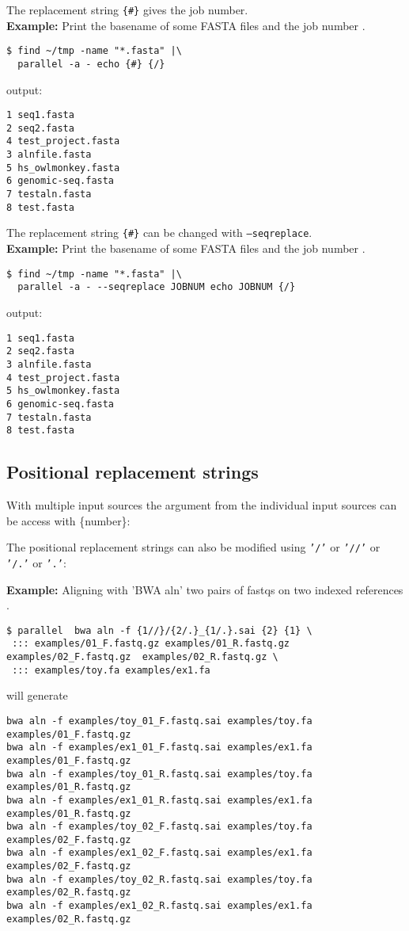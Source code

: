 \documentclass{article}
\newcommand{\example}[1]{
\textbf{Example: } {\color[rgb]{0,0,1} #1 } .
}
\begin{document}
The replacement string \texttt{\{\#\}} gives the job number.\\
\example{Print the basename of some FASTA files and the job number}
\begin{lstlisting}
$ find ~/tmp -name "*.fasta" |\
  parallel -a - echo {#} {/}
\end{lstlisting}
output:
\begin{lstlisting}
1 seq1.fasta
2 seq2.fasta
4 test_project.fasta
3 alnfile.fasta
5 hs_owlmonkey.fasta
6 genomic-seq.fasta
7 testaln.fasta
8 test.fasta
\end{lstlisting}

The replacement string \texttt{\{\#\}} can be changed with  \texttt{--seqreplace}.\\
\example{Print the basename of some FASTA files and the job number}
\begin{lstlisting}
$ find ~/tmp -name "*.fasta" |\
  parallel -a - --seqreplace JOBNUM echo JOBNUM {/}
\end{lstlisting}
output:
\begin{lstlisting}
1 seq1.fasta
2 seq2.fasta
3 alnfile.fasta
4 test_project.fasta
5 hs_owlmonkey.fasta
6 genomic-seq.fasta
7 testaln.fasta
8 test.fasta
\end{lstlisting}


\subsection{Positional replacement strings}
With multiple input sources the argument from the individual input sources can be access with \{number\}:


The positional replacement strings can also be modified using  \texttt{'/'}  or \texttt{'//'} or \texttt{'/.'} or  \texttt{'.'}:

\example{Aligning with 'BWA aln' two pairs of fastqs on two indexed references}
\begin{lstlisting}
$ parallel  bwa aln -f {1//}/{2/.}_{1/.}.sai {2} {1} \
 ::: examples/01_F.fastq.gz examples/01_R.fastq.gz examples/02_F.fastq.gz  examples/02_R.fastq.gz \
 ::: examples/toy.fa examples/ex1.fa
\end{lstlisting}
will generate
\begin{lstlisting}
bwa aln -f examples/toy_01_F.fastq.sai examples/toy.fa examples/01_F.fastq.gz
bwa aln -f examples/ex1_01_F.fastq.sai examples/ex1.fa examples/01_F.fastq.gz
bwa aln -f examples/toy_01_R.fastq.sai examples/toy.fa examples/01_R.fastq.gz
bwa aln -f examples/ex1_01_R.fastq.sai examples/ex1.fa examples/01_R.fastq.gz
bwa aln -f examples/toy_02_F.fastq.sai examples/toy.fa examples/02_F.fastq.gz
bwa aln -f examples/ex1_02_F.fastq.sai examples/ex1.fa examples/02_F.fastq.gz
bwa aln -f examples/toy_02_R.fastq.sai examples/toy.fa examples/02_R.fastq.gz
bwa aln -f examples/ex1_02_R.fastq.sai examples/ex1.fa examples/02_R.fastq.gz
\end{lstlisting}
\end{document}
